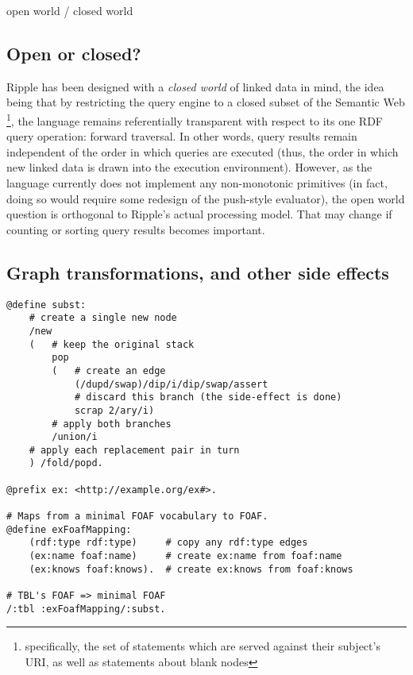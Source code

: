 \documentclass[runningheads]{llncs}
\begin{document}
open world / closed world


\subsection{Open or closed?}

Ripple has been designed with a \textit{closed world} of linked data in mind, the idea being that by restricting the query engine to a closed subset of the Semantic Web \footnote{specifically, the set of statements which are served against their subject's URI, as well as statements about blank nodes}, the language remains referentially transparent with respect to its one RDF query operation: forward traversal.  In other words, query results remain independent of the order in which queries are executed (thus, the order in which new linked data is drawn into the execution environment).  However, as the language currently does not implement any non-monotonic primitives (in fact, doing so would require some redesign of the push-style evaluator), the open world question is orthogonal to Ripple's actual processing model.  That may change if counting or sorting query results becomes important.

\subsection{Graph transformations, and other side effects}



\begin{verbatim}
@define subst:
    # create a single new node
    /new
    (   # keep the original stack
        pop
        (   # create an edge
            (/dupd/swap)/dip/i/dip/swap/assert
            # discard this branch (the side-effect is done)
            scrap 2/ary/i)
        # apply both branches
        /union/i
    # apply each replacement pair in turn
    ) /fold/popd.

@prefix ex: <http://example.org/ex#>.

# Maps from a minimal FOAF vocabulary to FOAF.
@define exFoafMapping:
    (rdf:type rdf:type)     # copy any rdf:type edges
    (ex:name foaf:name)     # create ex:name from foaf:name
    (ex:knows foaf:knows).  # create ex:knows from foaf:knows

# TBL's FOAF => minimal FOAF
/:tbl :exFoafMapping/:subst.
\end{verbatim}
\end{document}
